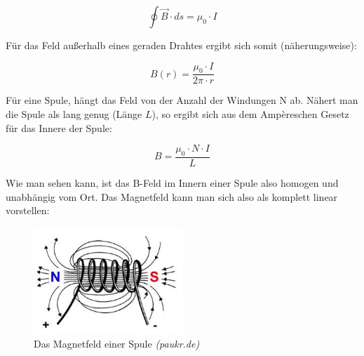 \begin{equation} \oint \vec B \cdot ds = \mu_0\cdot I \end{equation}

Für das Feld außerhalb eines geraden Drahtes ergibt sich somit (näherungsweise):

$$B(r) = \frac{\mu_0\cdot I}{2\pi\cdot r} $$

Für eine Spule, hängt das Feld von der Anzahl der Windungen N ab. Nähert man die Spule als lang genug (Länge $L$), so ergibt sich aus dem Ampèreschen Gesetz für das Innere der Spule:

\begin{equation} B = \frac{\mu_0\cdot N\cdot I}{L} \end{equation}

Wie man sehen kann, ist das B-Feld im Innern einer Spule also homogen und unabhängig vom Ort. Das Magnetfeld kann man sich also als komplett linear vorstellen:

\begin{figure}[H]
	\centering \includegraphics[width = 0.5\textwidth]{Bilder/Spule.jpg}
	\caption{Das Magnetfeld einer Spule \emph{(paukr.de)}}
\end{figure}





















\clearpage